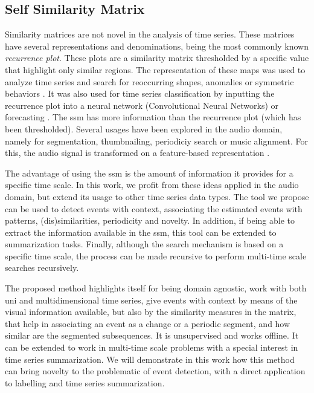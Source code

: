 \subsection{Self Similarity Matrix}

Similarity matrices are not novel in the analysis of time series. These matrices have several representations and denominations, being the most commonly known \textit{recurrence plot}. These plots are a similarity matrix thresholded by a specific value that highlight only similar regions. The representation of these maps was used to analyze time series \cite{eamonn_dotplots,recurrenceplots1} and search for reoccurring shapes, anomalies or symmetric behaviors \cite{eamonn_dotplots}. It was also used for time series classification by inputting the recurrence plot into a neural network (Convolutional Neural Networks) \cite{reccurenceplots1, recurrenceplots2} or forecasting \cite{recurrenceplots3}.
The \gls{ssm} has more information than the recurrence plot (which has been thresholded). Several usages have been explored in the audio domain, namely for segmentation, thumbnailing, periodiciy search or music alignment. For this, the audio signal is transformed on a feature-based representation \cite{fmp1, fmp2}. 

The advantage of using the \gls{ssm} is the amount of information it provides for a specific time scale. In this work, we profit from these ideas applied in the audio domain, but extend its usage to other time series data types. The tool we propose can be used to detect events with context, associating the estimated events with patterns, (dis)similarities, periodicity and novelty. In addition, if being able to extract the information available in the \gls{ssm}, this tool can be extended to summarization tasks. Finally, although the search mechanism is based on a specific time scale, the process can be made recursive to perform multi-time scale searches recursively.
\par
The proposed method highlights itself for being domain agnostic, work with both uni and multidimensional time series, give events with context by means of the visual information available, but also by the similarity measures in the matrix, that help in associating an event as a change or a periodic segment, and how similar are the segmented subsequences. It is unsupervised and works offline. It can be extended to work in multi-time scale problems with a special interest in time series summarization. We will demonstrate in this work how this method can bring novelty to the problematic of event detection, with a direct application to labelling and time series summarization.



